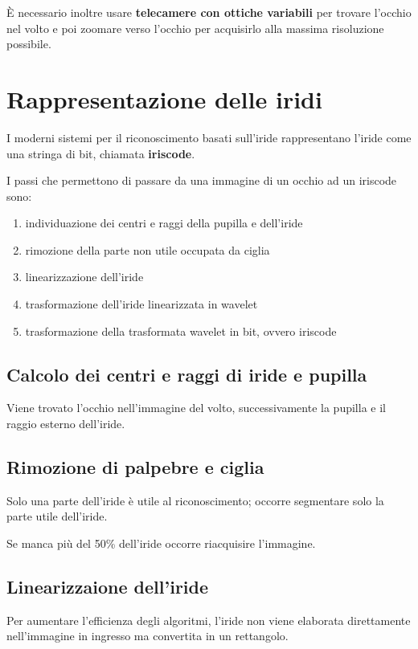 È necessario inoltre usare \textbf{telecamere con ottiche variabili} per trovare
l'occhio nel volto e poi zoomare verso l'occhio per acquisirlo alla massima
risoluzione possibile.

\section{Rappresentazione delle iridi}
I moderni sistemi per il riconoscimento basati sull'iride rappresentano l'iride come 
una stringa di bit, chiamata \textbf{iriscode}.

I passi che permettono di passare da una immagine di un occhio ad un iriscode sono:
\begin{enumerate}
    \item individuazione dei centri e raggi della pupilla e dell'iride 
    \item rimozione della parte non utile occupata da ciglia 
    \item linearizzazione dell'iride
    \item trasformazione dell'iride linearizzata in wavelet
    \item trasformazione della trasformata wavelet in bit, ovvero iriscode
\end{enumerate}

\subsection{Calcolo dei centri e raggi di iride e pupilla}
Viene trovato l'occhio nell'immagine del volto, successivamente la pupilla 
e il raggio esterno dell'iride.

\subsection{Rimozione di palpebre e ciglia}
Solo una parte dell'iride è utile al riconoscimento; occorre segmentare 
solo la parte utile dell'iride.

Se manca più del 50\% dell'iride occorre riacquisire l'immagine.

\subsection{Linearizzaione dell'iride}
Per aumentare l'efficienza degli algoritmi, l'iride non viene elaborata
direttamente nell'immagine in ingresso ma convertita in un rettangolo.

